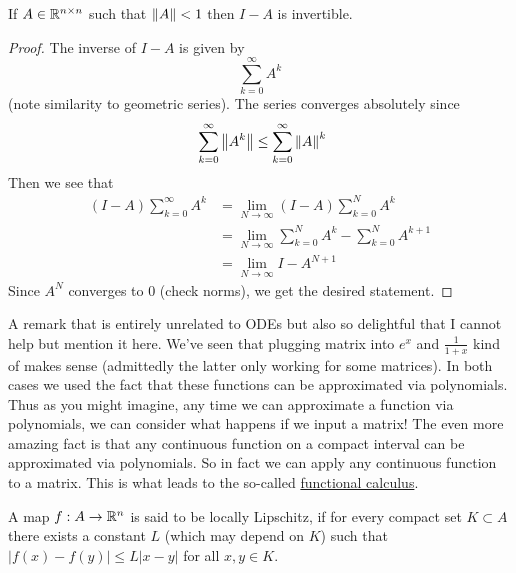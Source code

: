 \begin{lemma}
If $A \in \mathbb{R}^{n \times n}$ such that $\left\lVert A\right\rVert < 1$ then $I - A$ is invertible.
\end{lemma}
\begin{proof}
    The inverse of $I - A$ is given by
    $$ \sum_{k = 0}^{\infty} A^k $$
    (note similarity to geometric series). The series converges absolutely since
    \begin{align*}
        \ \sum_{k = 0}^{\infty} \left\lVert A^k\right\rVert \leq \sum_{k = 0}^{\infty} \left\lVert A\right\rVert^k
    \end{align*}
    Then we see that
    \begin{align*}
        (I - A) \sum_{k = 0}^{\infty} A^k &= \lim_{N \to \infty} (I - A) \sum_{k = 0}^{N} A^k\\
        &= \lim_{N \to \infty} \sum_{k = 0}^{N} A^k - \sum_{k = 0}^{N} A^{k + 1}\\
        &= \lim_{N \to \infty} I - A^{N + 1}
    \end{align*}
    Since $A^N$ converges to 0 (check norms), we get the desired statement.
\end{proof}
\begin{remark}
    A remark that is entirely unrelated to ODEs but also so delightful that I cannot help but mention it here. We've seen that plugging matrix into $e^x$ and $\frac{1}{1 + x}$ kind of makes sense (admittedly the latter only working for some matrices). In both cases we used the fact that these functions can be approximated via polynomials. Thus as you might imagine, any time we can approximate a function via polynomials, we can consider what happens if we input a matrix! The even more amazing fact is that any continuous function on a compact interval can be approximated via polynomials. So in fact we can apply any continuous function to a matrix. This is what leads to the so-called \href{https://en.wikipedia.org/wiki/Functional_calculus}{functional calculus}.
\end{remark}

\begin{definition}
A map $f: A \to \mathbb{R}^n$ is said to be locally Lipschitz, if for every compact set $K \subset A$ there exists a constant $L$ (which may depend on $K$) such that $|f(x) - f(y)| \leq L|x - y|$ for all $x, y \in K$.
\end{definition}


